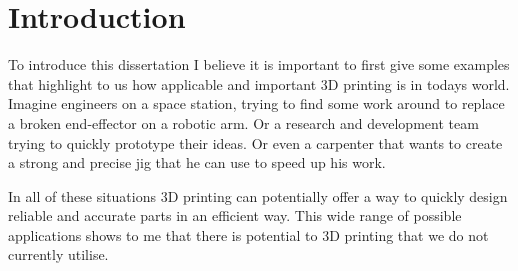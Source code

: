 \documentclass{l4proj}
\begin{document}
%
%
%
%
%
%
%
%
\chapter{Introduction}


To introduce this dissertation I believe it is important to first give some examples that highlight to us how applicable and important 3D printing is in todays world. Imagine engineers on a space station, trying to find some work around to replace a broken end-effector on a robotic arm. Or a research and development team trying to quickly prototype their ideas. Or even a carpenter that wants to create a strong and precise jig that he can use to speed up his work. 

In all of these situations 3D printing can potentially offer a way to quickly design reliable and accurate parts in an efficient way. This wide range of possible applications shows to me that there is potential to 3D printing that we do not currently utilise.  
\end{document}
